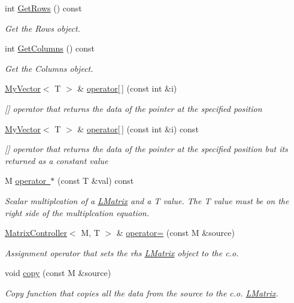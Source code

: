 \begin{DoxyCompactItemize}
int \mbox{\hyperlink{class_matrix_controller_a3cf741ea77589aae6557b691f4e4c3bb}{Get\+Rows}} () const
\begin{DoxyCompactList}\small\item\em Get the Rows object. \end{DoxyCompactList}\item 
int \mbox{\hyperlink{class_matrix_controller_a2d895a5b210bfc295308f97084e78002}{Get\+Columns}} () const
\begin{DoxyCompactList}\small\item\em Get the Columns object. \end{DoxyCompactList}\item 
\mbox{\hyperlink{class_my_vector}{My\+Vector}}$<$ T $>$ \& \mbox{\hyperlink{class_matrix_controller_a944709b73c0cf4d0b962eb26840a896a}{operator\mbox{[}$\,$\mbox{]}}} (const int \&i)
\begin{DoxyCompactList}\small\item\em \mbox{[}\mbox{]} operator that returns the data of the pointer at the specified position \end{DoxyCompactList}\item 
\mbox{\hyperlink{class_my_vector}{My\+Vector}}$<$ T $>$ \& \mbox{\hyperlink{class_matrix_controller_a59cfd6e10abd1a90fa0a1090bb4de240}{operator\mbox{[}$\,$\mbox{]}}} (const int \&i) const
\begin{DoxyCompactList}\small\item\em \mbox{[}\mbox{]} operator that returns the data of the pointer at the specified position but its returned as a constant value \end{DoxyCompactList}\item 
M \mbox{\hyperlink{class_matrix_controller_abe35dc2b5a0ce975799995097486893e}{operator $\ast$}} (const T \&val) const
\begin{DoxyCompactList}\small\item\em Scalar multiplcation of a \mbox{\hyperlink{class_l_matrix}{L\+Matrix}} and a T value. The T value must be on the right side of the multiplcation equation. \end{DoxyCompactList}\item 
\mbox{\hyperlink{class_matrix_controller}{Matrix\+Controller}}$<$ M, T $>$ \& \mbox{\hyperlink{class_matrix_controller_ad7a26021ed274944adbc4df6c068de35}{operator=}} (const M \&source)
\begin{DoxyCompactList}\small\item\em Assignment operator that sets the rhs \mbox{\hyperlink{class_l_matrix}{L\+Matrix}} object to the c.\+o. \end{DoxyCompactList}\item 
void \mbox{\hyperlink{class_matrix_controller_aced34d0065a5df3d3fadb140a782a22b}{copy}} (const M \&source)
\begin{DoxyCompactList}\small\item\em Copy function that copies all the data from the source to the c.\+o. \mbox{\hyperlink{class_l_matrix}{L\+Matrix}}. \end{DoxyCompactList}\end{DoxyCompactItemize}



